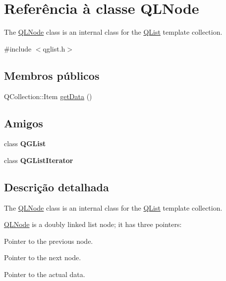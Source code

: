 \hypertarget{class_q_l_node}{\section{Referência à classe Q\-L\-Node}
\label{class_q_l_node}
}


The \hyperlink{class_q_l_node}{Q\-L\-Node} class is an internal class for the \hyperlink{class_q_list}{Q\-List} template collection.  




{\ttfamily \#include $<$qglist.\-h$>$}

\subsection*{Membros públicos}
\begin{DoxyCompactItemize}
\item 
Q\-Collection\-::\-Item \hyperlink{class_q_l_node_ad19a53b08099dc8fae156c9d91586f34}{get\-Data} ()
\end{DoxyCompactItemize}
\subsection*{Amigos}
\begin{DoxyCompactItemize}
\item 
\hypertarget{class_q_l_node_a9bfde3c3259271cb86b87bd78b399dd5}{class {\bfseries Q\-G\-List}}\label{class_q_l_node_a9bfde3c3259271cb86b87bd78b399dd5}

\item 
\hypertarget{class_q_l_node_a13dc100371e8931a394e57af8df9fbb3}{class {\bfseries Q\-G\-List\-Iterator}}\label{class_q_l_node_a13dc100371e8931a394e57af8df9fbb3}

\end{DoxyCompactItemize}


\subsection{Descrição detalhada}
The \hyperlink{class_q_l_node}{Q\-L\-Node} class is an internal class for the \hyperlink{class_q_list}{Q\-List} template collection. 

\hyperlink{class_q_l_node}{Q\-L\-Node} is a doubly linked list node; it has three pointers\-: 
\begin{DoxyEnumerate}
\item Pointer to the previous node. 
\item Pointer to the next node. 
\item Pointer to the actual data. 
\end{DoxyEnumerate}

